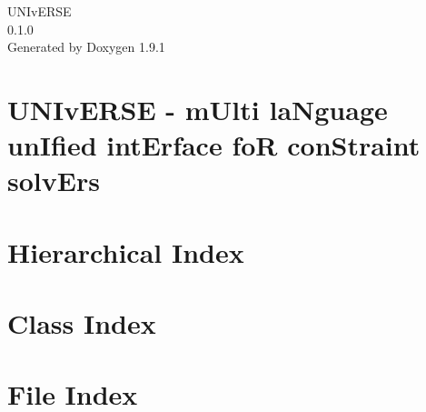 \let\mypdfximage\pdfximage\def\pdfximage{\immediate\mypdfximage}\documentclass[twoside]{book}
\newcommand{\+}{\discretionary{\mbox{\scriptsize$\hookleftarrow$}}{}{}}
\newcommand{\clearemptydoublepage}{%
  \newpage{\pagestyle{empty}\cleardoublepage}%
}
\begin{document}
\raggedbottom

\hypersetup{pageanchor=false,
             bookmarksnumbered=true,
             pdfencoding=unicode
            }
\begin{titlepage}
\vspace*{7cm}
\begin{center}%
{\Large UNIv\+ERSE \\[1ex]\large 0.\+1.\+0 }\\
\vspace*{1cm}
{\large Generated by Doxygen 1.9.1}\\
\end{center}
\end{titlepage}
\clearemptydoublepage
{}
\tableofcontents
\clearemptydoublepage
{}
\hypersetup{pageanchor=true}

\chapter{UNIv\+ERSE -\/ m\+Ulti la\+Nguage un\+Ified int\+Erface foR con\+Straint solv\+Ers}
\label{md__home_runner_work_universe_universe_doc_INDEX}

\chapter{Hierarchical Index}

\chapter{Class Index}

\chapter{File Index}

\end{document}
